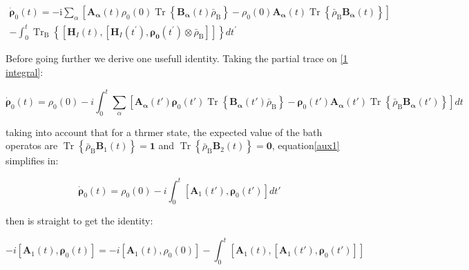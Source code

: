 \documentclass[%
preprint,
onecolumn,
notitlepag,
 amsmath,amssymb,
 aps,
 pra,
]{revtex4-2}
\begin{document}
\begin{equation}
\begin{align}
 \dot{\boldsymbol{\rho}}_0(t)=
-\mathrm{i} \sum_{\alpha}\left[\boldsymbol{A}_{\boldsymbol{\alpha}}(t) \rho_0(0) \operatorname{Tr}\left\{\boldsymbol{B}_{\boldsymbol{\alpha}}(t) \bar{\rho}_{\mathrm{B}}\right\}-\rho_0(0)  \boldsymbol{A}_{\boldsymbol{\alpha}}(t) \operatorname{Tr}\left\{\bar{\rho}_{\mathrm{B}} \boldsymbol{B}_{\boldsymbol{\alpha}}(t)\right\}\right] \\
-\int_{0}^{t} \operatorname{Tr}_{\mathrm{B}}\left\{\left[\boldsymbol{H}_{I}(t),\left[\boldsymbol{H}_{I}\left(t^{\prime}\right), \boldsymbol{ \rho_{0}}\left(t^{\prime}\right) \otimes \bar{\rho}_{\mathrm{B}}\right]\right]\right\} d t^{\prime}   
\end{align}
\label{RD1}
 \end{equation}



Before going further we derive one usefull identity. Taking the partial trace on \eqref{1 integral}: 

\begin{equation}
    \dot{\boldsymbol{\rho}}_0(t)= \rho_0(0) - i \int_0 ^t  \sum_{\alpha}\left[\boldsymbol{A}_{\boldsymbol{\alpha}}(t') \boldsymbol{\rho}_0(t') \operatorname{Tr}\left\{\boldsymbol{B}_{\boldsymbol{\alpha}}(t') \bar{\rho}_{\mathrm{B}}\right\}-\boldsymbol{\rho}_0(t') \boldsymbol{A}_{\boldsymbol{\alpha}}(t') \operatorname{Tr}\left\{\bar{\rho}_{\mathrm{B}} \boldsymbol{B}_{\boldsymbol{\alpha}}(t')\right\}\right] dt
    \label{aux1}
\end{equation}


taking into account that for a thrmer state, the expected value of the bath operatos are $ \operatorname{Tr}\left\{\bar{\rho}_{\mathrm{B}} \boldsymbol{B}_1(t)\right\}  = \mathbf{1} $ and $\operatorname{Tr}\left\{\bar{\rho}_{\mathrm{B}} \boldsymbol{B}_2 (t)\right\}= \mathbf{0} $, equation\eqref{aux1}  simplifies in:

\begin{equation}
     \dot{\boldsymbol{\rho}}_0(t)=  \rho_0(0) - i \int_0^t \left[\boldsymbol{A}_1(t') ,  \boldsymbol{\rho}_0(t')  \right] dt'
\end{equation}

then is straight  to get the identity:


\begin{equation}
  -i \left[ \boldsymbol{A}_1(t), \boldsymbol{\rho}_0(t)  \right]  = -i \left[ \boldsymbol{A}_1(t), \rho_0(0)  \right] - \int_0^t \left[  \boldsymbol{A}_1(t), \left[ \boldsymbol{A}_1(t') , \boldsymbol{\rho}_0(t')   \right]        \right]
    \label{identity1}
\end{equation}
\end{document}
